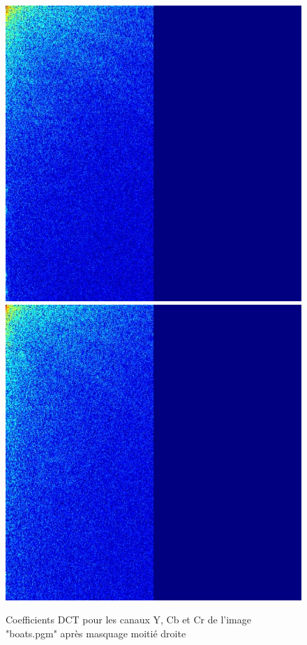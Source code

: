 \documentclass[12pt]{report}
\begin{document}
\begin{figure}[H]
\begin{center}
\includegraphics[scale=0.25]{../ImageRes/dct_masked1_1.jpg} 
\includegraphics[scale=0.25]{../ImageRes/dct_masked1_2.jpg} 
\caption{Coefficients DCT pour les canaux Y, Cb et Cr de l'image "boats.pgm" après masquage moitié droite}
\end{center}
\end{figure}
\end{document}
